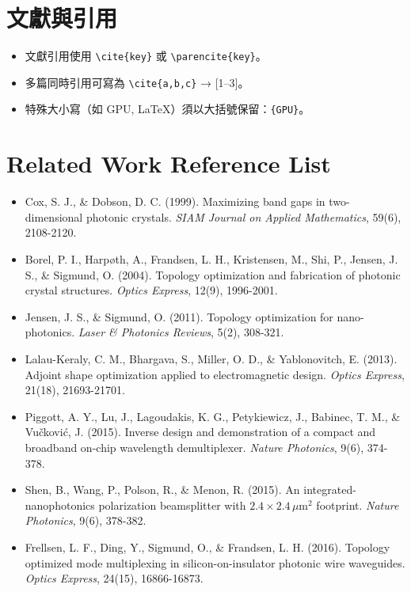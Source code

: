 \section*{文獻與引用}
\begin{itemize}
  \item 文獻引用使用 \verb|\cite{key}| 或 \verb|\parencite{key}|。
  \item 多篇同時引用可寫為 \verb|\cite{a,b,c}| → [1–3]。
  \item 特殊大小寫（如 GPU, LaTeX）須以大括號保留：\verb|{GPU}|。
\end{itemize}

\section*{Related Work Reference List}
\begin{itemize}
  \item[{[1]}] Cox, S. J., \& Dobson, D. C. (1999). Maximizing band gaps in two-dimensional photonic crystals. \textit{SIAM Journal on Applied Mathematics}, 59(6), 2108-2120.
  \item[{[2]}] Borel, P. I., Harpøth, A., Frandsen, L. H., Kristensen, M., Shi, P., Jensen, J. S., \& Sigmund, O. (2004). Topology optimization and fabrication of photonic crystal structures. \textit{Optics Express}, 12(9), 1996-2001.
  \item[{[3]}] Jensen, J. S., \& Sigmund, O. (2011). Topology optimization for nano-photonics. \textit{Laser \& Photonics Reviews}, 5(2), 308-321.
  \item[{[4]}] Lalau-Keraly, C. M., Bhargava, S., Miller, O. D., \& Yablonovitch, E. (2013). Adjoint shape optimization applied to electromagnetic design. \textit{Optics Express}, 21(18), 21693-21701.
  \item[{[5]}] Piggott, A. Y., Lu, J., Lagoudakis, K. G., Petykiewicz, J., Babinec, T. M., \& Vu\v{c}kovi\'{c}, J. (2015). Inverse design and demonstration of a compact and broadband on-chip wavelength demultiplexer. \textit{Nature Photonics}, 9(6), 374-378.
  \item[{[6]}] Shen, B., Wang, P., Polson, R., \& Menon, R. (2015). An integrated-nanophotonics polarization beamsplitter with $2.4\times 2.4\,\mu\text{m}^2$ footprint. \textit{Nature Photonics}, 9(6), 378-382.
  \item[{[7]}] Frellsen, L. F., Ding, Y., Sigmund, O., \& Frandsen, L. H. (2016). Topology optimized mode multiplexing in silicon-on-insulator photonic wire waveguides. \textit{Optics Express}, 24(15), 16866-16873.

\end{itemize}
